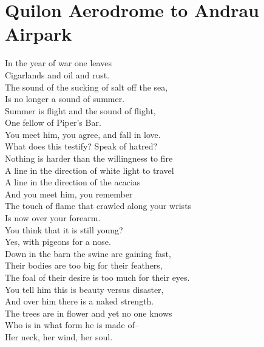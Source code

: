 \documentclass[smalldemyvopaper,11pt,twoside,onecolumn,openright,extrafontsizes]{memoir}
\begin{document}
\chapter{Quilon Aerodrome to Andrau Airpark}
In the year of war one leaves
\\Cigarlands and oil and rust.
\\The sound of the sucking of salt off the sea,
\\Is no longer a sound of summer.
\\Summer is flight and the sound of flight,
\\One fellow of Piper's Bar.
\\You meet him, you agree, and fall in love.
\\What does this testify?   Speak of hatred?
\\Nothing is harder than the willingness to fire
\\A line in the direction of white light to travel
\\A line in the direction of the acacias
\\And you meet him, you remember
\\The touch of flame that crawled along your wrists
\\Is now over your forearm.
\\You think that it is still young?
\\Yes, with pigeons for a nose.
\\Down in the barn the swine are gaining fast,
\\Their bodies are too big for their feathers,
\\The foal of their desire is too much for their eyes.
\\You tell him this is beauty versus disaster,
\\And over him there is a naked strength.
\\The trees are in flower and yet no one knows
\\Who is in what form he is made of--
\\Her neck, her wind, her soul.
\end{document}
